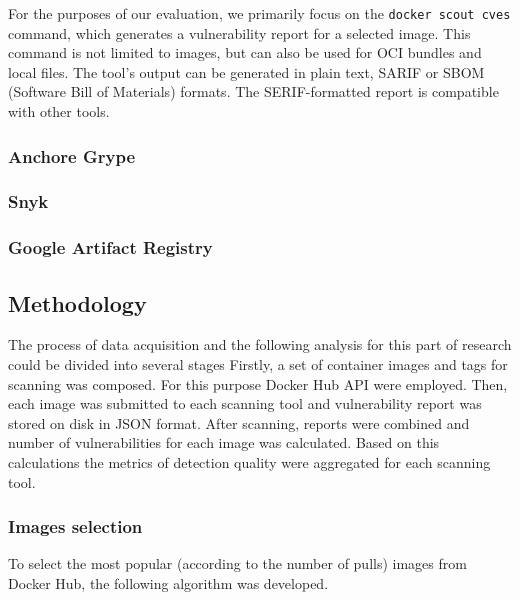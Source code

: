 For the purposes of our evaluation, we primarily focus on the \texttt{docker scout cves} command, which generates a vulnerability report for a selected image. This command is not limited to images, but can also be used for OCI bundles and local files. The tool's output can be generated in plain text, SARIF or SBOM (Software Bill of Materials) formats. The SERIF-formatted report is compatible with other tools.


\subsubsection{Anchore Grype}


\subsubsection{Snyk}




\subsubsection{Google Artifact Registry}











\subsection{Methodology}

The process of data acquisition and the following analysis for this part of research could be divided into several stages Firstly, a set of container images and tags for scanning was composed. For this purpose Docker Hub API were employed. Then, each image was submitted to each scanning tool and vulnerability report was stored on disk in JSON format. After scanning, reports were combined and number of vulnerabilities for each image was calculated. Based on this calculations the metrics of detection quality were aggregated for each scanning tool.

\subsubsection{Images selection}

To select the most popular (according to the number of pulls) images from Docker Hub, the following algorithm was developed.

